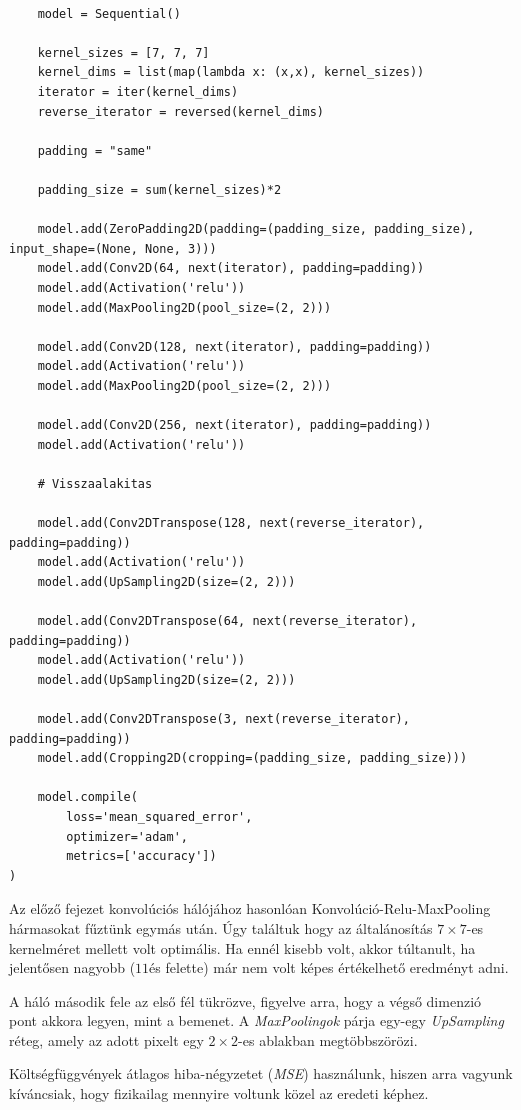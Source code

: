 \lstset{language=Python}
\begin{lstlisting}  

	model = Sequential()
	
	kernel_sizes = [7, 7, 7]
	kernel_dims = list(map(lambda x: (x,x), kernel_sizes))
	iterator = iter(kernel_dims)
	reverse_iterator = reversed(kernel_dims)
	
	padding = "same"
	
	padding_size = sum(kernel_sizes)*2
	
	model.add(ZeroPadding2D(padding=(padding_size, padding_size), input_shape=(None, None, 3)))
	model.add(Conv2D(64, next(iterator), padding=padding))
	model.add(Activation('relu'))
	model.add(MaxPooling2D(pool_size=(2, 2)))
	
	model.add(Conv2D(128, next(iterator), padding=padding))
	model.add(Activation('relu'))
	model.add(MaxPooling2D(pool_size=(2, 2)))
	
	model.add(Conv2D(256, next(iterator), padding=padding))
	model.add(Activation('relu'))
	
	# Visszaalakitas
	
	model.add(Conv2DTranspose(128, next(reverse_iterator), padding=padding))
	model.add(Activation('relu'))
	model.add(UpSampling2D(size=(2, 2)))
	
	model.add(Conv2DTranspose(64, next(reverse_iterator), padding=padding))
	model.add(Activation('relu'))
	model.add(UpSampling2D(size=(2, 2)))
	
	model.add(Conv2DTranspose(3, next(reverse_iterator), padding=padding))
	model.add(Cropping2D(cropping=(padding_size, padding_size)))
	
	model.compile(
		loss='mean_squared_error',
		optimizer='adam', 
		metrics=['accuracy']) 
) 

\end{lstlisting}


Az előző fejezet konvolúciós hálójához hasonlóan Konvolúció-Relu-MaxPooling hármasokat
fűztünk egymás után. Úgy találtuk hogy az általánosítás $ 7 \times 7 $-es kernelméret 
mellett volt optimális. Ha ennél kisebb volt, akkor túltanult, ha jelentősen nagyobb 
($ 11  $és felette) már nem volt képes értékelhető eredményt adni.

A háló második fele az első fél tükrözve, figyelve arra, hogy a végső dimenzió pont akkora 
legyen, mint a bemenet. A \textit{MaxPoolingok} párja egy-egy \textit{UpSampling} réteg, amely az adott
pixelt egy $ 2 \times 2 $-es ablakban megtöbbszörözi.

Költségfüggvények átlagos hiba-négyzetet (\textit{MSE}) használunk, hiszen arra vagyunk 
kíváncsiak, hogy fizikailag mennyire voltunk közel az eredeti képhez.


